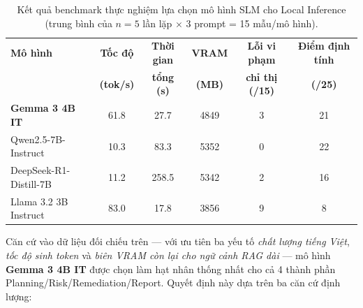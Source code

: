 \begin{table}[!htb]
    \centering
    \caption{Kết quả benchmark thực nghiệm lựa chọn mô hình SLM cho Local Inference (trung bình của $n=5$ lần lặp $\times$ 3 prompt = 15 mẫu/mô hình).}
    \label{tab:model_benchmark}
    \renewcommand{\arraystretch}{1.3}
    \begin{tabular}{|l|c|c|c|c|c|}
        \hline
        \textbf{Mô hình} & \textbf{Tốc độ} & \textbf{Thời gian} & \textbf{VRAM} & \textbf{Lỗi vi phạm} & \textbf{Điểm định tính} \\
        & \textbf{(tok/s)} & \textbf{tổng (s)} & \textbf{(MB)} & \textbf{chỉ thị (/15)} & \textbf{(/25)} \\
        \hline
        \textbf{Gemma 3 4B IT} & 61.8 & 27.7 & 4849 & 3 & 21 \\
        \hline
        Qwen2.5-7B-Instruct & 10.3 & 83.3 & 5352 & 0 & 22 \\
        \hline
        DeepSeek-R1-Distill-7B & 11.2 & 258.5 & 5342 & 2 & 16 \\
        \hline
        Llama 3.2 3B Instruct & 83.0 & 17.8 & 3856 & 9 & 8 \\
        \hline
    \end{tabular}
\end{table}

Căn cứ vào dữ liệu đối chiếu trên --- với ưu tiên ba yếu tố \textit{chất lượng tiếng Việt}, \textit{tốc độ sinh token} và \textit{biên VRAM còn lại cho ngữ cảnh RAG dài} --- mô hình \textbf{Gemma 3 4B IT} \cite{google2025gemma3} được chọn làm hạt nhân thống nhất cho cả 4 thành phần Planning/Risk/Remediation/Report. Quyết định này dựa trên ba căn cứ định lượng:

